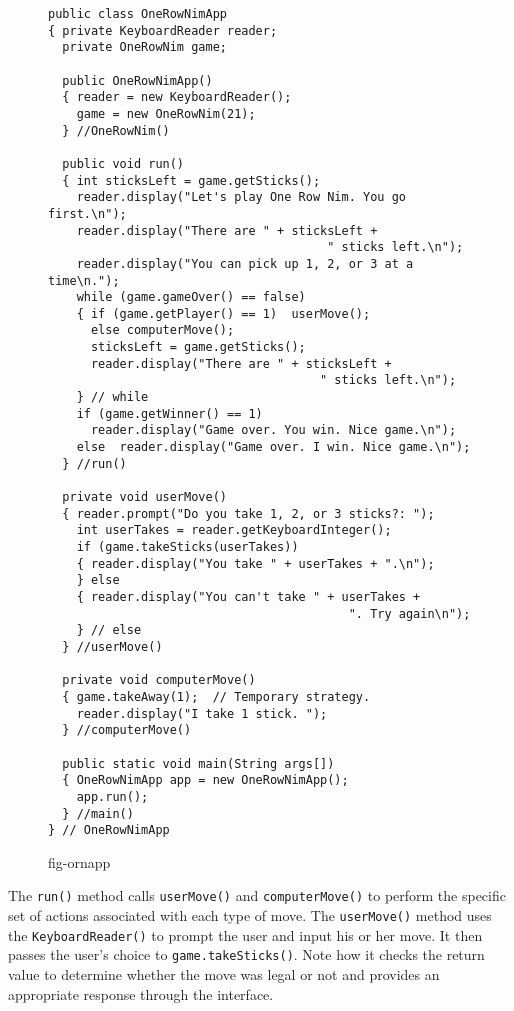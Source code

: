 \begin{figure}[p]
\jjjprogstart
\begin{jjjlisting}[31pc]
\begin{lstlisting}
public class OneRowNimApp 
{ private KeyboardReader reader;
  private OneRowNim game;

  public OneRowNimApp() 
  { reader = new KeyboardReader();
    game = new OneRowNim(21);
  } //OneRowNim()
    
  public void run() 
  { int sticksLeft = game.getSticks();
    reader.display("Let's play One Row Nim. You go first.\n");
    reader.display("There are " + sticksLeft + 
                                       " sticks left.\n");
    reader.display("You can pick up 1, 2, or 3 at a time\n.");
    while (game.gameOver() == false)       
    { if (game.getPlayer() == 1)  userMove();
      else computerMove();
      sticksLeft = game.getSticks();
      reader.display("There are " + sticksLeft + 
                                      " sticks left.\n");
    } // while
    if (game.getWinner() == 1) 
      reader.display("Game over. You win. Nice game.\n");
    else  reader.display("Game over. I win. Nice game.\n");
  } //run()
    
  private void userMove() 
  { reader.prompt("Do you take 1, 2, or 3 sticks?: ");
    int userTakes = reader.getKeyboardInteger();
    if (game.takeSticks(userTakes)) 
    { reader.display("You take " + userTakes + ".\n");
    } else 
    { reader.display("You can't take " + userTakes + 
                                          ". Try again\n");
    } // else
  } //userMove()
    
  private void computerMove() 
  { game.takeAway(1);  // Temporary strategy.
    reader.display("I take 1 stick. ");
  } //computerMove()
    
  public static void main(String args[]) 
  { OneRowNimApp app = new OneRowNimApp();
    app.run();
  } //main()
} // OneRowNimApp
\end{lstlisting}
\end{jjjlisting}
{fig-ornapp}
\end{figure}


The {\tt run()} method calls {\tt userMove()} and {\tt computerMove()}
to perform the specific set of actions associated with each type of
move.  The {\tt userMove()} method uses the {\tt KeyboardReader()} to
prompt the user and input his or her move. It then passes the user's
choice to {\tt game.takeSticks()}. Note how it checks the return value
to determine whether the move was legal or not and provides an
appropriate response through the interface.

